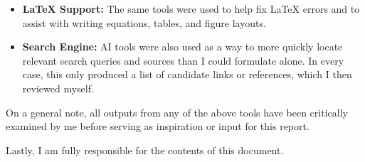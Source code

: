 \begin{itemize}
    \item \textbf{\LaTeX{} Support:} The same tools were used to help
    fix \LaTeX{} errors and to assist with writing equations, tables,
    and figure layouts.

    \item \textbf{Search Engine:} AI tools were also used as a way to
    more quickly locate relevant search queries and sources than I
    could formulate alone. In every case, this only produced a list of
    candidate links or references, which I then reviewed myself.
\end{itemize}

On a general note, all outputs from any of the above tools have been
critically examined by me before serving as inspiration or input for
this report.

Lastly, I am fully responsible for the contents of this document.
